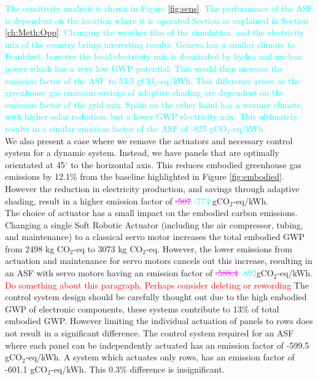\textcolor{cyan}{The sensitivity analysis is shown in Figure \ref{fig:sens}. The performance of the ASF is dependent on the location where it is operated Section as explained in Section \ref{ch:Meth:Opp}. Changing the weather files of the simulation, and the electricity mix of the country brings interesting results. Geneva has a similar climate to Frankfurt, however the local electricity mix is dominated by hydro and nuclear power which has a very low GWP potential\cite{itten2012life}. This would then increase the emission factor of the ASF to 53.5 gCO$_{2}$-eq/kWh. This difference arises as the greenhouse gas emission savings of adaptive shading are dependent on the emission factor of the grid mix.
Spain on the other hand has a warmer climate, with higher solar radiation, but a lower GWP electricity mix. This ultimately results in a similar emission factor of the ASF of -825 gCO$_{2}$-eq/kWh.}\\


We also present a case where we remove the actuators and necessary control system for a dynamic system. Instead, we have panels that are optimally orientated at 45$^{\circ}$ to the horizontal axis. This reduces embodied greenhouse gas emissions by 12.1\% from the baseline highlighted in Figure \ref{fig:embodied}. However the reduction in electricity production, and savings through adaptive shading, result in a higher emission factor of \textcolor{magenta}{\sout{-507}} \textcolor{cyan}{-773} gCO$_{2}$-eq/kWh.\\

The choice of actuator has a small impact on the embodied carbon emissions. Changing a single Soft Robotic Actuator (including the air compressor, tubing, and maintenance) to a classical servo motor increases the total embodied GWP from 2498 kg CO$_{2}$-eq to 3073 kg CO$_{2}$-eq. However, the lower emissions from actuation and maintenance for servo motors cancels out this increase, resulting in an ASF with servo motors having an emission factor of \textcolor{magenta}{\sout{-588.4}} \textcolor{cyan}{-892}gCO$_{2}$-eq/kWh.\\
\textcolor{red}{Do something about this paragraph. Perhaps consider deleting or rewording}
The control system design should be carefully thought out due to the high embodied GWP of electronic components, these systems contribute to 13\% of total embodied GWP. However limiting the individual actuation of panels to rows does not result in a significant difference. The control system required for an ASF where each panel can be independently actuated has an emission factor of -599.5 gCO$_{2}$-eq/kWh. A system which actuates only rows, has an emission factor of -601.1 gCO$_{2}$-eq/kWh. This 0.3\% difference is insignificant.\\

